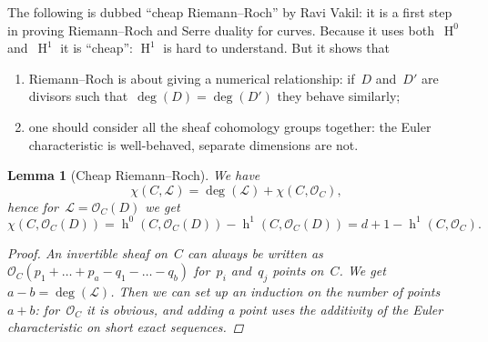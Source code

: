 \documentclass[10pt,a4paper]{article}
\theoremstyle{lecture}
\newtheorem{lemma}[theorem]{Lemma}
\DeclareMathOperator\hh{h}
\DeclareMathOperator\HH{H}
\begin{document}
The following is dubbed ``cheap Riemann--Roch'' by Ravi Vakil: it is a first step in proving Riemann--Roch and Serre duality for curves. Because it uses both~$\HH^0$ and~$\HH^1$ it is ``cheap'': $\HH^1$ is hard to understand. But it shows that
\begin{enumerate}
  \item Riemann--Roch is about giving a numerical relationship: if~$D$ and~$D'$ are divisors such that~$\deg(D)=\deg(D')$ they behave similarly;
  \item one should consider all the sheaf cohomology groups together: the Euler characteristic is well-behaved, separate dimensions are not.
\end{enumerate}
\begin{lemma}[Cheap Riemann--Roch]
  \label{lemma:cheap-riemann-roch}
  We have
  \begin{equation}
    \chi(C,\mathcal{L})=\deg(\mathcal{L})+\chi(C,\mathcal{O}_C),
  \end{equation}
  hence for~$\mathcal{L}=\mathcal{O}_C(D)$ we get
  \begin{equation}
    \chi(C,\mathcal{O}_C(D))=\hh^0(C,\mathcal{O}_C(D))-\hh^1(C,\mathcal{O}_C(D))=d+1-\hh^1(C,\mathcal{O}_C).
  \end{equation}

  \begin{proof}
    An invertible sheaf on~$C$ can always be written as~$\mathcal{O}_C(p_1+\dotso+p_a-q_1-\dotso-q_b)$ for~$p_i$ and~$q_j$ points on~$C$. We get~$a-b=\deg(\mathcal{L})$. Then we can set up an induction on the number of points~$a+b$: for~$\mathcal{O}_C$ it is obvious, and adding a point uses the additivity of the Euler characteristic on short exact sequences.
  \end{proof}
\end{lemma}
\end{document}
